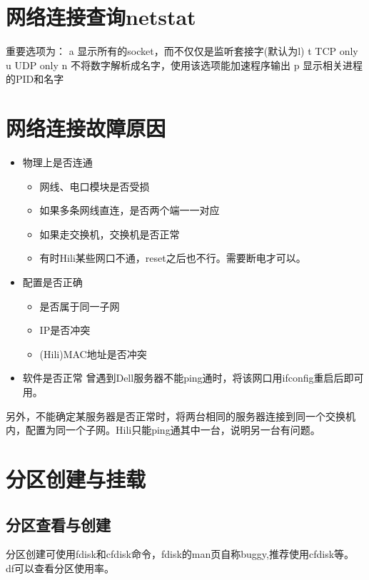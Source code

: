 \section{网络连接查询netstat}

重要选项为：
a 显示所有的socket，而不仅仅是监听套接字(默认为l)
t TCP only
u UDP only
n 不将数字解析成名字，使用该选项能加速程序输出
p 显示相关进程的PID和名字









\section{网络连接故障原因}
\begin{itemize}
    \item 物理上是否连通
        \begin{itemize}
            \item 网线、电口模块是否受损
            \item 如果多条网线直连，是否两个端一一对应
            \item 如果走交换机，交换机是否正常
            \item 有时Hili某些网口不通，reset之后也不行。需要断电才可以。

        \end{itemize}
    \item 配置是否正确
        \begin{itemize}
            \item 是否属于同一子网
            \item IP是否冲突
            \item (Hili)MAC地址是否冲突
        \end{itemize}
    \item 软件是否正常
        曾遇到Dell服务器不能ping通时，将该网口用ifconfig重启后即可用。
        
\end{itemize}

另外，不能确定某服务器是否正常时，将两台相同的服务器连接到同一个交换机内，配置为同一个子网。Hili只能ping通其中一台，说明另一台有问题。
\section{分区创建与挂载}

\subsection{分区查看与创建}
分区创建可使用fdisk和cfdisk命令，fdisk的man页自称buggy,推荐使用cfdisk等。
df可以查看分区使用率。

